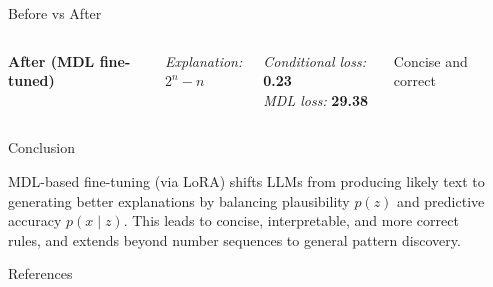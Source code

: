 \documentclass[final]{beamer}
\newlength{\sepwidth}
\newlength{\colwidth}
\newcommand{\separatorcolumn}{\begin{column}{\sepwidth}\end{column}}
\begin{document}
\begin{frame}[t]
\begin{columns}[t]
\begin{column}{\colwidth}
\begin{block}{Before vs After}
\begin{columns}

\textbf{After (MDL fine-tuned)}

\smallskip
\textit{Explanation:} \\
$2^n - n$

\smallskip
\textit{Conditional loss:} \textbf{0.23} \\
\textit{MDL loss:} \textbf{29.38}

\vspace{0.5em}
\textcolor{green!60!black}{Concise and correct}

\end{columns}

\end{block}

\begin{block}{Conclusion}

MDL-based fine-tuning (via LoRA) shifts LLMs from producing likely text to generating better explanations by balancing plausibility $p(z)$ and predictive accuracy $p(x \mid z)$. This leads to concise, interpretable, and more correct rules, and extends beyond number sequences to general pattern discovery.

\end{block}

  \begin{block}{References}

    \nocite{*}
    \footnotesize{}

  \end{block}

\end{column}

\separatorcolumn
\end{columns}
\end{frame}
\end{document}
